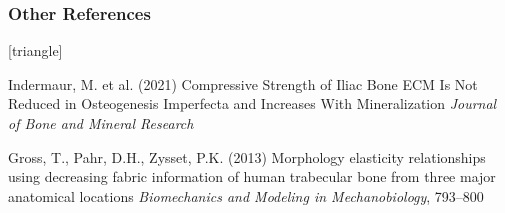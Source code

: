 \documentclass[xcolor=table,11pt]{beamer}
\begin{document}
\begin{frame}
	\frametitle{Other References}
	\footnotesize{
		\begin{thebibliography}{99}
			[triangle]
			
			  Indermaur, M. et al. (2021)
			\newblock Compressive Strength of Iliac Bone ECM Is Not Reduced in Osteogenesis Imperfecta and Increases With Mineralization
			\newblock \textit{Journal of Bone and Mineral Research}
			
			  Gross, T., Pahr, D.H., Zysset, P.K. (2013)
			\newblock Morphology elasticity relationships using decreasing fabric information of human trabecular bone from three major anatomical locations
			\newblock \textit{ Biomechanics and Modeling in Mechanobiology}, 793–800
			
		\end{thebibliography}
	}
\end{frame}

\end{document}

